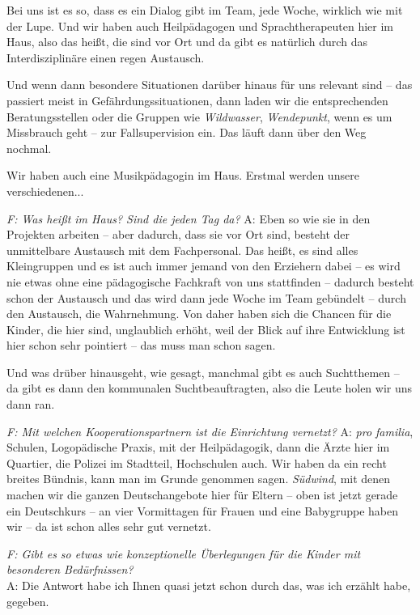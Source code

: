 \begin{linenumbers*}
Bei uns ist es so, dass es ein Dialog gibt im Team, jede Woche, wirklich wie mit der Lupe. 
Und wir haben auch Heilpädagogen und Sprachtherapeuten hier im Haus, also das heißt, die sind vor Ort und da gibt es natürlich durch das Interdisziplinäre einen regen Austausch. 

Und wenn dann besondere Situationen darüber hinaus für uns relevant sind -- das passiert meist in Gefährdungssituationen, dann laden wir die entsprechenden Beratungsstellen oder die Gruppen wie \emph{Wildwasser}, \emph{Wendepunkt}, wenn es um Missbrauch geht -- zur Fallsupervision ein. Das läuft dann über den Weg nochmal. 

Wir haben auch eine Musikpädagogin im Haus. Erstmal werden unsere verschiedenen...

\emph{F: Was heißt im Haus? Sind die jeden Tag da?}
A: Eben so wie sie in den Projekten arbeiten -- aber dadurch, dass sie vor Ort sind, besteht der unmittelbare Austausch mit dem Fachpersonal.
Das heißt, es sind alles Kleingruppen und es ist auch immer jemand von den Erziehern dabei -- es wird nie etwas ohne eine pädagogische Fachkraft von uns stattfinden -- dadurch besteht schon der Austausch und das wird dann jede Woche im Team gebündelt -- durch den Austausch, die Wahrnehmung. Von daher haben sich die Chancen für die Kinder, die hier sind, unglaublich erhöht, weil der Blick auf ihre Entwicklung ist hier schon sehr pointiert -- das muss man schon sagen. 

Und was drüber hinausgeht, wie gesagt, manchmal gibt es auch Suchtthemen -- da gibt es dann den kommunalen Suchtbeauftragten, also die Leute holen wir uns dann ran. 

\emph{F: Mit welchen Kooperationspartnern ist die Einrichtung vernetzt?}
A: \emph{pro familia}, Schulen, Logopädische Praxis, mit der Heilpädagogik, dann die Ärzte hier im Quartier, die Polizei im Stadtteil, Hochschulen auch. Wir haben da ein recht breites Bündnis, kann man im Grunde genommen sagen.
\emph{Südwind},
mit denen machen wir die ganzen Deutschangebote hier für Eltern -- oben ist jetzt gerade ein Deutschkurs -- an vier Vormittagen für Frauen und eine Babygruppe haben wir -- da ist schon alles sehr gut vernetzt. 

\emph{F: Gibt es so etwas wie konzeptionelle Überlegungen für die Kinder mit besonderen Bedürfnissen?}\\
A: Die Antwort habe ich Ihnen quasi jetzt schon durch das, was ich erzählt habe, gegeben.\\


\end{linenumbers*}
